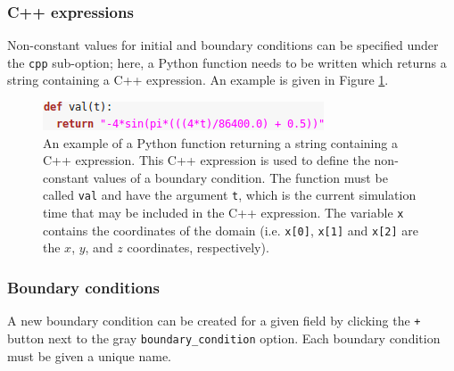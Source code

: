 \documentclass[a4paper,11pt]{report}
\begin{document}
\subsubsection{C++ expressions}
Non-constant values for initial and boundary conditions can be specified under the \texttt{cpp} sub-option; here, a Python function needs to be written which returns a string containing a C++ expression. An example is given in Figure \ref{fig:cpp_expression}.

\begin{figure}[!ht]
   \centering
   \includegraphics[width=0.5\columnwidth]{images/cpp_expression.png}
   \caption{An example of a Python function returning a string containing a C++ expression. This C++ expression is used to define the non-constant values of a boundary condition. The function must be called \texttt{val} and have the argument \texttt{t}, which is the current simulation time that may be included in the C++ expression. The variable \texttt{x} contains the coordinates of the domain (i.e. \texttt{x[0]}, \texttt{x[1]} and \texttt{x[2]} are the $x$, $y$, and $z$ coordinates, respectively).}
   \label{fig:cpp_expression}
\end{figure}

\subsubsection{Boundary conditions}
A new boundary condition can be created for a given field by clicking the \texttt{+} button next to the gray \texttt{boundary\_condition} option. Each boundary condition must be given a unique name.
\end{document}
